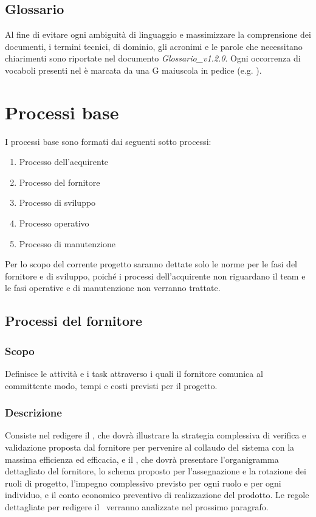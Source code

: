 \documentclass[12pt,a4paper]{article}
\begin{document}
\subsection{Glossario}
Al fine di evitare ogni ambiguità di linguaggio e massimizzare la comprensione dei
documenti, i termini tecnici, di dominio, gli acronimi e le parole che necessitano chiarimenti sono riportate nel documento \emph{Glossario\_v1.2.0}. Ogni occorrenza di vocaboli presenti nel \GlO è marcata da una G maiuscola in pedice (e.g. ).

\newpage

\section{Processi base} %
I processi base sono formati dai seguenti sotto processi:
\begin{enumerate}
\item Processo dell'acquirente
\item Processo del fornitore
\item Processo di sviluppo
\item Processo operativo
\item Processo di manutenzione
\end{enumerate}
Per lo scopo del corrente progetto saranno dettate solo le norme per le fasi del fornitore e di sviluppo, poiché i processi  dell'acquirente non riguardano il team e le fasi operative e di manutenzione non verranno trattate.

\subsection{Processi del fornitore}

\subsubsection{Scopo}
Definisce le attività e i task attraverso i quali il fornitore comunica al committente modo, tempi e costi previsti per il progetto.

\subsubsection{Descrizione}
Consiste nel redigere il \PdQ, che dovrà illustrare la strategia complessiva di verifica e validazione proposta dal fornitore per pervenire al collaudo del sistema con la massima efficienza ed efficacia, e il \PdP, che dovrà presentare l'organigramma dettagliato del fornitore, lo schema proposto per l'assegnazione e la rotazione dei ruoli di progetto, l'impegno complessivo previsto per ogni ruolo e per ogni individuo, e il conto economico preventivo di realizzazione del prodotto. Le regole dettagliate per redigere il \PdP\ verranno analizzate nel prossimo paragrafo.
\end{document}
